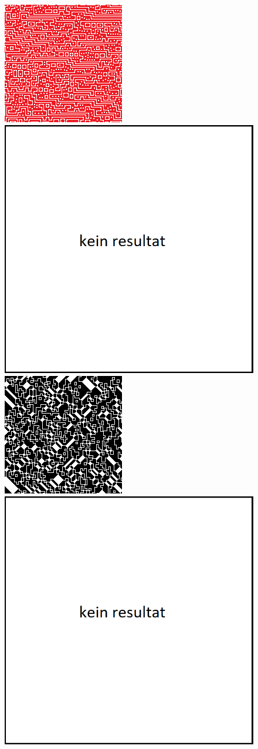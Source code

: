 \documentclass[12pt, a4paper,twoside,openright]{report} %
\begin{document}
\begin{figure}[H]
    \centering
    \includegraphics[width=0.45\linewidth]{images/wfc-model-comparison/red-dot-model.png}%
    \qquad
    \includegraphics[width=0.45\linewidth]{images/wfc-model-comparison/kein-resultat.png}%
    \vspace{1em}
    \includegraphics[width=0.45\linewidth]{images/wfc-model-comparison/shrew-model.png}%
    \qquad
    \includegraphics[width=0.45\linewidth]{images/wfc-model-comparison/kein-resultat.png}%

\end{figure}
\end{document}

